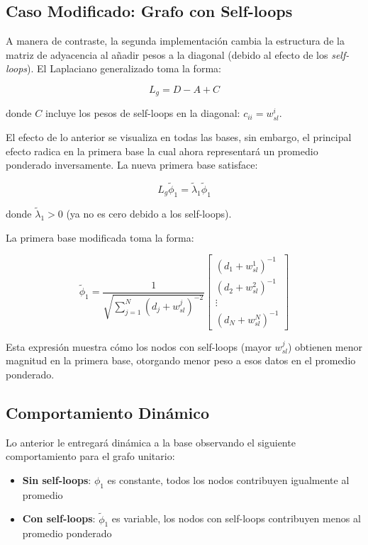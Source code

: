     \subsection{Caso Modificado: Grafo con Self-loops}
    
    A manera de contraste, la segunda implementación cambia la estructura de la matriz de adyacencia al añadir pesos a la diagonal (debido al efecto de los \textit{self-loops}). El Laplaciano generalizado toma la forma:
    
    $$L_g = D - A + C$$
    
    donde $C$ incluye los pesos de self-loops en la diagonal: ${c}_{ii} =  w^i_{sl}$.
    
    El efecto de lo anterior se visualiza en todas las bases, sin embargo, el principal efecto radica en la primera base la cual ahora representará un promedio ponderado inversamente. La nueva primera base satisface:
    
    $$L_g\tilde{\phi}_1 = \tilde{\lambda}_1 \tilde{\phi}_1$$
    
    donde $\tilde{\lambda}_1 > 0$ (ya no es cero debido a los self-loops).
    
    La primera base modificada toma la forma:
    
    $$\tilde{\phi}_1 = \frac{1}{\sqrt{\sum_{j=1}^{N} (d_j + w^j_{sl})^{-2}}} \begin{bmatrix} (d_1 + w^1_{sl})^{-1} \\ (d_2 + w^2_{sl})^{-1} \\ \vdots \\ (d_N + w^N_{sl})^{-1} \end{bmatrix}$$
    
    Esta expresión muestra cómo los nodos con self-loops (mayor $w^j_{sl}$) obtienen menor magnitud en la primera base, otorgando menor peso a esos datos en el promedio ponderado.
    
    \subsection{Comportamiento Dinámico}
    
    Lo anterior le entregará dinámica a la base observando el siguiente comportamiento para el grafo unitario:
    
    \begin{itemize}
       \item \textbf{Sin self-loops}: $\phi_1$ es constante, todos los nodos contribuyen igualmente al promedio
       \item \textbf{Con self-loops}: $\tilde{\phi}_1$ es variable, los nodos con self-loops contribuyen menos al promedio ponderado
    \end{itemize}
    
